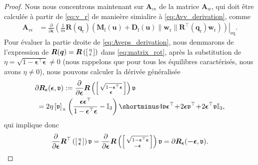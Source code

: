\begin{proof}
Nous nous concentrons maintenant sur $\boldsymbol{A}_{v\epsilon}$ de la matrice 
$\boldsymbol{A}_{w}$,  qui doit être calculée à partir de \eqref{eq:v_r} de manieère simialire à
\eqref{eq:Avv_derivation}, comme
\begin{align}
\boldsymbol{A}_{v\epsilon} &\!=\! \frac{\partial }{\partial \boldsymbol{\epsilon}}  \left. \left( \frac{1}{m} \boldsymbol{R}(\boldsymbol{q}_{\text{r}}) \left( 
\boldsymbol{M}_{\text{f}}(\boldsymbol{u}) +  
\boldsymbol{D}_{\text{f}}(\boldsymbol{u}) \lVert \boldsymbol{w}_{\text{r}} \rVert \boldsymbol{R}^\top \!(\boldsymbol{q}_{\mathrm{r}}) \boldsymbol{w}_{\text{r}}  \right) \right)\right|_{\text{eq}}.
\label{eq:Aveps_derivation}
\end{align} 
Pour évaluer la partie droite de \eqref{eq:Aveps_derivation}, nous demmarons de l'expression de $\boldsymbol{R}(\boldsymbol{q}) = \boldsymbol{R}\left( \left[ \begin{smallmatrix}\eta \\ \epsilon \end{smallmatrix} \right]\right)$ dans \eqref{eq:matrix_rot}, après la substitution de 
$\eta = \sqrt{1-\boldsymbol{\epsilon}^\top \boldsymbol{\epsilon}} \neq 0$
(nous rappelons que pour tous les équilibres caractérisés, nous avons $\eta \neq 0$), nous pouvons calculer la dérivée généralisée
\begin{align}
\label{eq:diffR_eps}
&\partial \boldsymbol{R}_{\boldsymbol{ \epsilon}} (\boldsymbol{ \epsilon},\mathfrak{v}) := \frac{\partial }{\partial \boldsymbol{\epsilon}}
\boldsymbol{R}\left(
\smallmat{\sqrt{1-\boldsymbol{\epsilon}^\top \boldsymbol{\epsilon}} \\ \boldsymbol{\epsilon}}
\right) \mathfrak{v}  \\
\nonumber
&\; = 2 \eta \skewsym{\mathfrak{v}} \left( \frac{\boldsymbol{\epsilon}\boldsymbol{\epsilon}^\top}{1-\boldsymbol{\epsilon}^\top \boldsymbol{\epsilon}} - \mathbb{I}_{3}  \right) \shortminus 4 \mathfrak{v} \boldsymbol{\epsilon}^\top \! + \!2\boldsymbol{\epsilon} \mathfrak{v}^\top \!+ \! 2\boldsymbol{\epsilon}^\top \mathfrak{v} \mathbb{I}_{3},
\end{align}
qui implique donc
\begin{align}
\label{eq:diffRtop}
    \frac{\partial }{\partial \boldsymbol{\epsilon}}
\boldsymbol{R}^\top\left(
\smallmat{\eta \\ \boldsymbol{\epsilon}}
\right) \mathfrak{v} =
    \frac{\partial }{\partial \boldsymbol{\epsilon}}
\boldsymbol{R}\left(
\smallmat{\sqrt{1-\boldsymbol{\epsilon}^\top \boldsymbol{\epsilon}} \\ -\boldsymbol{\epsilon}}
\right) \mathfrak{v} = \partial \boldsymbol{R}_{\boldsymbol{ \epsilon}} (\boldsymbol{ -\epsilon},\mathfrak{v}).

\end{align}
\end{proof}
